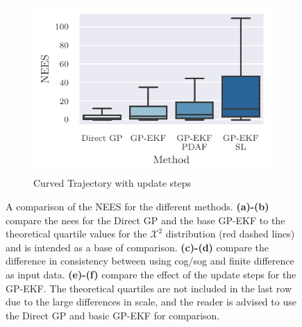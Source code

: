 \begin{figure}
{\begin{subfigure}{0.6\textwidth}
            \includegraphics{figures/curved_line_stats/nees.pdf}
            \caption{Curved Trajectory with update steps}
            \label{fig:stats_curved_nees_update}
        \end{subfigure}
    }

    \caption{A comparison of the NEES for the different methods. \textbf{(a)-(b)} compare the \acrshort{nees} for the Direct GP and the base GP-EKF to the theoretical quartile values for the $\mathcal{X}^2$ distribution (red dashed lines) and is intended as a base of comparison. \textbf{(c)-(d)} compare the difference in consistency between using \acrshort{cog}/\acrshort{sog} and finite difference as input data. \textbf{(e)-(f)} compare the effect of the update steps for the GP-EKF. The theoretical quartiles are not included in the last row due to the large differences in scale, and the reader is advised to use the Direct GP and basic GP-EKF for comparison.}

\end{figure}






